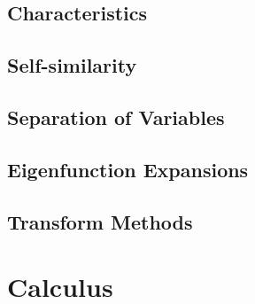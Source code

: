 \documentclass[oneside,a4paper,11pt]{report}
\begin{document}
\section{Characteristics}

\section{Self-similarity}

\section{Separation of Variables}

\section{Eigenfunction Expansions}

\section{Transform Methods}

\appendix

\chapter{Calculus}

\end{document}
